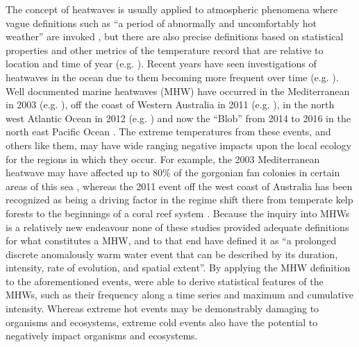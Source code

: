 \documentclass[a4paper,10pt,review]{elsarticle}
\begin{document}
The concept of heatwaves is usually applied to atmospheric phenomena where vague definitions such as ``a period of abnormally and uncomfortably hot weather'' are invoked \citep{Glickman2000}, but there are also precise definitions based on statistical properties and other metrics of the temperature record that are relative to location and time of year (e.g. \cite{Meehl2004, Alexander2006, Fischer2010, Fischer2011, Perkins2013}). Recent years have seen investigations of heatwaves in the ocean due to them becoming more frequent over time (e.g. \cite{Mackenzie2007, Selig2010, Sura2011, Lima2012, DeCastro2014}). Well documented marine heatwaves (MHW) have occurred in the Mediterranean in 2003 (e.g. \cite{Black2004, Olita2007, Garrabou2009}), off the coast of Western Australia in 2011 (e.g. \cite{Feng2013, Pearce2013, Wernberg2013}), in the north west Atlantic Ocean in 2012 (e.g. \cite{Mills2012, Chen2014, Chen2015}) and now the ``Blob'' from 2014 to 2016 in the north east Pacific Ocean \citep{Bond2015}. The extreme temperatures from these events, and others like them, may have wide ranging negative impacts upon the local ecology for the regions in which they occur. For example, the 2003 Mediterranean heatwave may have affected up to 80\% of the gorgonian fan colonies in certain areas of this sea \citep{Garrabou2009}, whereas the 2011 event off the west coast of Australia has been recognized as being a driving factor in the regime shift there from temperate kelp forests to the beginnings of a coral reef system \citep{Wernberg2013}. Because the inquiry into MHWs is a relatively new endeavour none of these studies provided adequate definitions for what constitutes a MHW, and to that end \citet{Hobday2016} have defined it as ``a prolonged discrete anomalously warm water event that can be described by its duration, intensity, rate of evolution, and spatial extent''. By applying the MHW definition to the aforementioned events, \citet{Hobday2016} were able to derive statistical features of the MHWs, such as their frequency along a time series and maximum and cumulative intensity. Whereas extreme hot events may be demonstrably damaging to organisms and ecosystems, extreme cold events also have the potential to negatively impact organisms and ecosystems.
\end{document}
